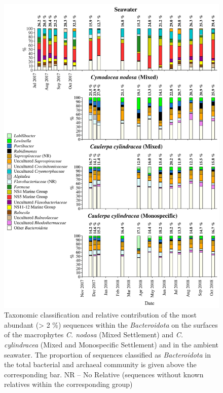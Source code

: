 \documentclass[12pt,]{article}
\begin{document}
\begin{figure}[H]

{\centering \includegraphics[width=0.85\linewidth]{../results/figures/bacteroidota_bar_plot} 

}

\caption{Taxonomic classification and relative contribution of the most abundant (> 2 \si{\percent}) sequences within the \textit{Bacteroidota} on the surfaces of the macrophytes \textit{C. nodosa} (Mixed Settlement) and \textit{C. cylindracea} (Mixed and Monospecific Settlement) and in the ambient seawater. The proportion of sequences classified as \textit{Bacteroidota} in the total bacterial and archaeal community is given above the corresponding bar. NR -- No Relative (sequences without known relatives within the corresponding group)\label{bactero}}\label{fig:unnamed-chunk-6}
\end{figure}
\end{document}
